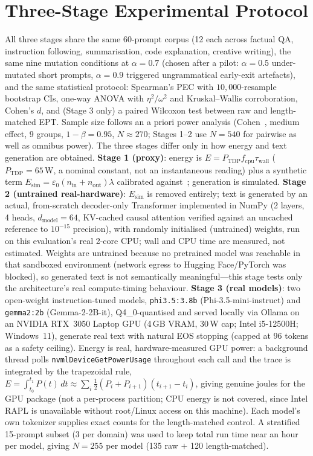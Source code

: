 \documentclass[conference]{IEEEtran}
\begin{document}
\section{Three-Stage Experimental Protocol}
\label{sec:protocol}
All three stages share the same 60-prompt corpus (12 each across
factual QA, instruction following, summarisation, code explanation,
creative writing), the same nine mutation conditions at $\alpha=0.7$
(chosen after a pilot: $\alpha=0.5$ under-mutated short prompts,
$\alpha=0.9$ triggered ungrammatical early-exit artefacts), and the
same statistical protocol: Spearman's PEC with $10{,}000$-resample
bootstrap CIs, one-way ANOVA with $\eta^2/\omega^2$ and
Kruskal--Wallis corroboration, Cohen's $d$, and (Stage 3 only) a
paired Wilcoxon test between raw and length-matched EPT. Sample size
follows an a priori power analysis (Cohen~\cite{cohen1988statistical},
medium effect, 9 groups, $1-\beta=0.95$, $N\approx270$; Stages 1--2 use
$N=540$ for pairwise as well as omnibus power).
The three stages differ only in how energy and text generation are
obtained. \textbf{Stage 1 (proxy)}: energy is $E=P_\text{TDP}f_\text{cpu}
\tau_\text{wall}$ ($P_\text{TDP}=65$\,W, a nominal constant, not an
instantaneous reading) plus a synthetic term
$E_\text{sim}=\varepsilon_0(n_\text{in}+n_\text{out})\lambda$ calibrated
against~\cite{samsi2023words,faiz2024llmcarbon}; generation is
simulated. \textbf{Stage 2 (untrained real-hardware)}: $E_\text{sim}$
is removed entirely; text is generated by an actual, from-scratch
decoder-only Transformer implemented in NumPy (2 layers, 4 heads,
$d_\text{model}=64$, KV-cached causal attention verified against an
uncached reference to $10^{-15}$ precision), with randomly initialised
(untrained) weights, run on this evaluation's real 2-core CPU; wall
and CPU time are measured, not estimated. Weights are untrained
because no pretrained model was reachable in that sandboxed
environment (network egress to Hugging Face/PyTorch was blocked), so
generated text is not semantically meaningful---this stage tests only
the architecture's real compute-timing behaviour. \textbf{Stage 3
(real models)}: two open-weight instruction-tuned models,
\texttt{phi3.5:3.8b} (Phi-3.5-mini-instruct) and \texttt{gemma2:2b}
(Gemma-2-2B-it), Q4\_0-quantised and served locally via Ollama on an
NVIDIA RTX~3050 Laptop GPU (4\,GB VRAM, 30\,W cap; Intel i5-12500H;
Windows~11), generate real text with natural EOS stopping (capped at
96 tokens as a safety ceiling). Energy is real, hardware-measured GPU
power: a background thread polls \texttt{nvmlDeviceGetPowerUsage}
throughout each call and the trace is integrated by the trapezoidal
rule,
$E=\int_{t_0}^{t_1}P(t)\,dt\approx\sum_i\tfrac12(P_i+P_{i+1})(t_{i+1}-t_i)$,
giving genuine joules for the GPU package (not a per-process
partition; CPU energy is not covered, since Intel RAPL is unavailable
without root/Linux access on this machine). Each model's own
tokenizer supplies exact counts for the length-matched control. A
stratified 15-prompt subset (3 per domain) was used to keep total
run time near an hour per model, giving $N=255$ per model (135 raw
$+$ 120 length-matched).
\end{document}
